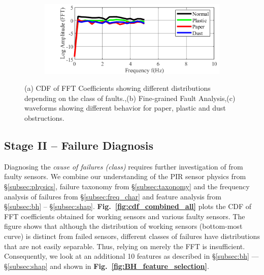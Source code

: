 \begin{figure}
\begin{subfigure}[t]{0.41\textwidth}
		\includegraphics[width=\linewidth]{figures/classification/LensDefects/Log_Aout_Paper_Plastic_Dust_Normal.png}
		\caption{}
		\label{fig:finegrained_aout}
	\end{subfigure}
	\caption{\footnotesize{(a) CDF of FFT Coefficients showing different distributions depending on the class of faults.,(b) Fine-grained Fault Analysis,(c) \textbf{\aout} waveforms showing different behavior for paper, plastic and dust obstructions.}
	}
	\label{}
\end{figure}

\subsection{Stage II -- Failure Diagnosis} 

Diagnosing the \textit{cause of failures (\ie class)} requires further investigation of \aout from faulty sensors.
%
We combine our understanding of the PIR sensor \ie physics from \S\ref{subsec:physics}, failure taxonomy from \S\ref{subsec:taxonomy} and the frequency analysis of failures from \S\ref{subsec:freq_char} and feature analysis from \S\ref{subsec:bh} -- \S\ref{subsec:shap}. 
%
{\bfseries Fig.~\ref{fig:cdf_combined_all}} plots the CDF of FFT coefficients obtained for working sensors and various faulty sensors. 
%
The figure shows that although the distribution of working sensors (bottom-most curve) is distinct from failed sensors, different classes of failures have distributions that are not easily separable. 
%
Thus, relying on merely the FFT is insufficient. 
%
Consequently, we look at an additional 10 features as described in \S\ref{subsec:bh} --- \S\ref{subsec:shap} and shown in {\bfseries Fig.~\ref{fig:BH_feature_selection}}. 
%
%
%

